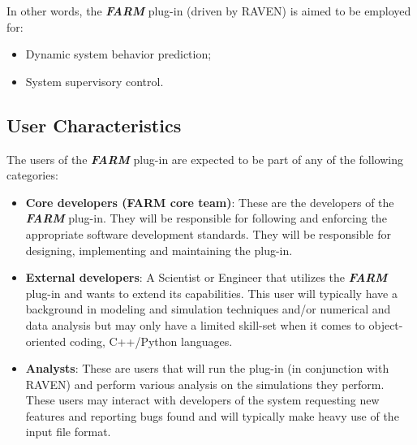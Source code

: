 In other words, the  \textbf{\textit{FARM}} plug-in (driven by RAVEN) is aimed to be employed for:
\begin{itemize}
  \item Dynamic system behavior prediction;
  \item System supervisory control.
\end{itemize}


\subsection{User Characteristics}

The users of the \textbf{\textit{FARM}} plug-in are expected to be part of any of the following categories:
\begin{itemize}
  \item \textbf{Core developers (FARM core team)}: These are the developers of the \textbf{\textit{FARM}}  plug-in. They will be 
    responsible for following
    and enforcing the appropriate software development standards. They will be responsible for designing, implementing and 
    maintaining the plug-in.
  \item \textbf{External developers}: A Scientist or Engineer that utilizes the \textbf{\textit{FARM}}  plug-in and wants to 
    extend its capabilities. This user will typically have a background in modeling and 
    simulation techniques and/or numerical and data analysis but may only have a limited skill-set 
    when it comes to object-oriented coding, C++/Python languages.
  \item \textbf{Analysts}:  These are users that will run the plug-in (in conjunction with RAVEN) and perform various analysis on the 
  simulations they perform. These users may interact with developers of the system requesting new features and reporting bugs found 
  and will typically make heavy use of the input file format.
\end{itemize}

